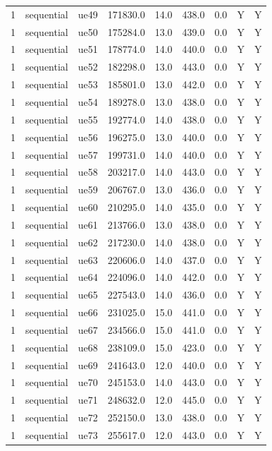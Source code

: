 \begin{table}[ht]
\begin{tabular}{|c|c|c|c|c|c|c|c|c|}
1 & sequential & ue49 & 171830.0 & 14.0 & 438.0 & 0.0 & Y & Y \\
1 & sequential & ue50 & 175284.0 & 13.0 & 439.0 & 0.0 & Y & Y \\
1 & sequential & ue51 & 178774.0 & 14.0 & 440.0 & 0.0 & Y & Y \\
1 & sequential & ue52 & 182298.0 & 13.0 & 443.0 & 0.0 & Y & Y \\
1 & sequential & ue53 & 185801.0 & 13.0 & 442.0 & 0.0 & Y & Y \\
1 & sequential & ue54 & 189278.0 & 13.0 & 438.0 & 0.0 & Y & Y \\
1 & sequential & ue55 & 192774.0 & 14.0 & 438.0 & 0.0 & Y & Y \\
1 & sequential & ue56 & 196275.0 & 13.0 & 440.0 & 0.0 & Y & Y \\
1 & sequential & ue57 & 199731.0 & 14.0 & 440.0 & 0.0 & Y & Y \\
1 & sequential & ue58 & 203217.0 & 14.0 & 443.0 & 0.0 & Y & Y \\
1 & sequential & ue59 & 206767.0 & 13.0 & 436.0 & 0.0 & Y & Y \\
1 & sequential & ue60 & 210295.0 & 14.0 & 435.0 & 0.0 & Y & Y \\
1 & sequential & ue61 & 213766.0 & 13.0 & 438.0 & 0.0 & Y & Y \\
1 & sequential & ue62 & 217230.0 & 14.0 & 438.0 & 0.0 & Y & Y \\
1 & sequential & ue63 & 220606.0 & 14.0 & 437.0 & 0.0 & Y & Y \\
1 & sequential & ue64 & 224096.0 & 14.0 & 442.0 & 0.0 & Y & Y \\
1 & sequential & ue65 & 227543.0 & 14.0 & 436.0 & 0.0 & Y & Y \\
1 & sequential & ue66 & 231025.0 & 15.0 & 441.0 & 0.0 & Y & Y \\
1 & sequential & ue67 & 234566.0 & 15.0 & 441.0 & 0.0 & Y & Y \\
1 & sequential & ue68 & 238109.0 & 15.0 & 423.0 & 0.0 & Y & Y \\
1 & sequential & ue69 & 241643.0 & 12.0 & 440.0 & 0.0 & Y & Y \\
1 & sequential & ue70 & 245153.0 & 14.0 & 443.0 & 0.0 & Y & Y \\
1 & sequential & ue71 & 248632.0 & 12.0 & 445.0 & 0.0 & Y & Y \\
1 & sequential & ue72 & 252150.0 & 13.0 & 438.0 & 0.0 & Y & Y \\
1 & sequential & ue73 & 255617.0 & 12.0 & 443.0 & 0.0 & Y & Y \\

\end{tabular}
\end{table}
